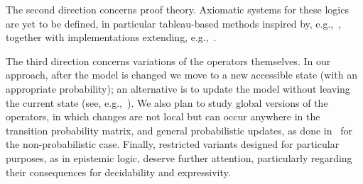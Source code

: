 The second direction concerns proof theory. Axiomatic systems for these logics are yet to be defined, in particular tableau-based methods inspired by, e.g.,~\cite{ArecesFH13,Fervari14,KozhemiachenkoS26}, together with implementations extending, e.g.,~\cite{HoffmannA09,ArecesFHM16}.

The third direction concerns variations of the operators themselves. In our approach, after the model is changed we move to a new accessible state (with an appropriate probability); an alternative is to update the model without leaving the current state (see, e.g.,~\cite{GierasimczukKV09}). We also plan to study global versions of the operators, in which changes are not local but can occur anywhere in the transition probability matrix, and general probabilistic updates, as done in~\cite{ArecesFH15} for the non-probabilistic case. Finally, restricted variants designed for particular purposes, as in epistemic logic, deserve further attention, particularly regarding their consequences for decidability and expressivity.


